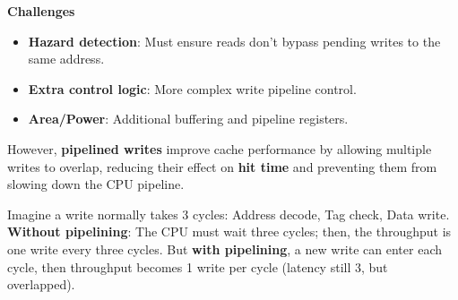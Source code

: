 \highspace
\begin{flushleft}
    \textcolor{Red2}{ \textbf{Challenges}}
\end{flushleft}
\begin{itemize}
    \item[\textcolor{Red2}{\faIcon{times}}] \textbf{Hazard detection}: Must ensure reads don't bypass pending writes to the same address.
    \item[\textcolor{Red2}{\faIcon{times}}] \textbf{Extra control logic}: More complex write pipeline control.
    \item[\textcolor{Red2}{\faIcon{times}}] \textbf{Area/Power}: Additional buffering and pipeline registers.
\end{itemize}
However, \textbf{pipelined writes} improve cache performance by allowing multiple writes to overlap, reducing their effect on \textbf{hit time} and preventing them from slowing down the CPU pipeline.

\highspace
\begin{examplebox}
    Imagine a write normally takes 3 cycles: Address decode, Tag check, Data write. \textbf{Without pipelining}: The CPU must wait three cycles; then, the throughput is one write every three cycles. But \textbf{with pipelining}, a new write can enter each cycle, then throughput becomes 1 write per cycle (latency still 3, but overlapped).
\end{examplebox}